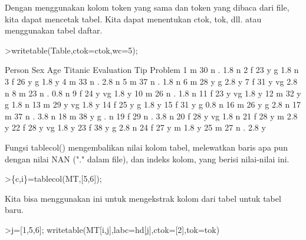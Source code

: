\documentclass[a4paper,10pt]{article}
\begin{document}
\begin{eulernotebook}
\begin{eulercomment}
\begin{eulercomment}
\begin{eulercomment}
Dengan menggunakan kolom token yang sama dan token yang dibaca dari
file, kita dapat mencetak tabel. Kita dapat menentukan ctok, tok, dll.
atau menggunakan tabel daftar.
\end{eulercomment}
\begin{eulerprompt}
>writetable(Table,ctok=ctok,wc=5);
\end{eulerprompt}
\begin{euleroutput}
   Person  Sex  Age Titanic Evaluation  Tip Problem
        1    m   30       n          .  1.8       n
        2    f   23       y          g  1.8       n
        3    f   26       y          g  1.8       y
        4    m   33       n          .  2.8       n
        5    m   37       n          .  1.8       n
        6    m   28       y          g  2.8       y
        7    f   31       y         vg  2.8       n
        8    m   23       n          .  0.8       n
        9    f   24       y         vg  1.8       y
       10    m   26       n          .  1.8       n
       11    f   23       y         vg  1.8       y
       12    m   32       y          g  1.8       n
       13    m   29       y         vg  1.8       y
       14    f   25       y          g  1.8       y
       15    f   31       y          g  0.8       n
       16    m   26       y          g  2.8       n
       17    m   37       n          .  3.8       n
       18    m   38       y          g    .       n
       19    f   29       n          .  3.8       n
       20    f   28       y         vg  1.8       n
       21    f   28       y          m  2.8       y
       22    f   28       y         vg  1.8       y
       23    f   38       y          g  2.8       n
       24    f   27       y          m  1.8       y
       25    m   27       n          .  2.8       y
\end{euleroutput}
\begin{eulercomment}
Fungsi tablecol() mengembalikan nilai kolom tabel, melewatkan baris
apa pun dengan nilai NAN ("." dalam file), dan indeks kolom, yang
berisi nilai-nilai ini.
\end{eulercomment}
\begin{eulerprompt}
>\{c,i\}=tablecol(MT,[5,6]);
\end{eulerprompt}
\begin{eulercomment}
Kita bisa menggunakan ini untuk mengekstrak kolom dari tabel untuk
tabel baru.
\end{eulercomment}
\begin{eulerprompt}
>j=[1,5,6]; writetable(MT[i,j],labc=hd[j],ctok=[2],tok=tok)
\end{eulerprompt}

\end{eulercomment}
\end{eulercomment}
\end{eulernotebook}
\end{document}
